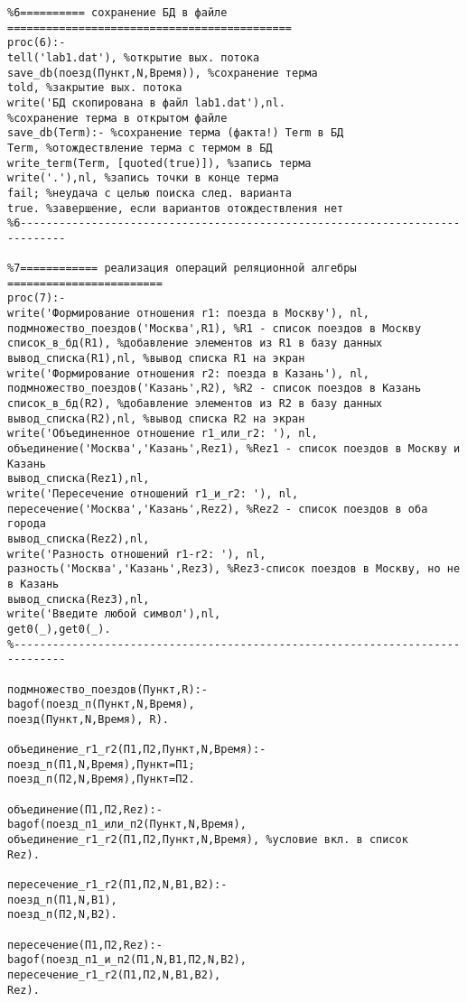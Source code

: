 \documentclass[a4paper,14pt]{extarticle}
\begin{document}
\begin{lstlisting}
%6========== сохранение БД в файле ============================================ 
proc(6):- 
tell('lab1.dat'), %открытие вых. потока 
save_db(поезд(Пункт,N,Время)), %сохранение терма 
told, %закрытие вых. потока 
write('БД скопирована в файл lab1.dat'),nl. 
%сохранение терма в открытом файле 
save_db(Term):- %сохранение терма (факта!) Term в БД 
Term, %отождествление терма с термом в БД 
write_term(Term, [quoted(true)]), %запись терма 
write('.'),nl, %запись точки в конце терма 
fail; %неудача с целью поиска след. варианта 
true. %завершение, если вариантов отождествления нет 
%6----------------------------------------------------------------------------- 
  
%7============ реализация операций реляционной алгебры ======================== 
proc(7):- 
write('Формирование отношения r1: поезда в Москву'), nl, 
подмножество_поездов('Москва',R1), %R1 - список поездов в Москву 
список_в_бд(R1), %добавление элементов из R1 в базу данных 
вывод_списка(R1),nl, %вывод списка R1 на экран 
write('Формирование отношения r2: поезда в Казань'), nl, 
подмножество_поездов('Казань',R2), %R2 - список поездов в Казань 
список_в_бд(R2), %добавление элементов из R2 в базу данных 
вывод_списка(R2),nl, %вывод списка R2 на экран 
write('Объединенное отношение r1_или_r2: '), nl, 
объединение('Москва','Казань',Rez1), %Rez1 - список поездов в Москву и Казань 
вывод_списка(Rez1),nl, 
write('Пересечение отношений r1_и_r2: '), nl, 
пересечение('Москва','Казань',Rez2), %Rez2 - список поездов в оба города 
вывод_списка(Rez2),nl, 
write('Разность отношений r1-r2: '), nl, 
разность('Москва','Казань',Rez3), %Rez3-список поездов в Москву, но не в Казань 
вывод_списка(Rez3),nl, 
write('Введите любой символ'),nl, 
get0(_),get0(_). 
%------------------------------------------------------------------------------ 
  
подмножество_поездов(Пункт,R):- 
bagof(поезд_п(Пункт,N,Время), 
поезд(Пункт,N,Время), R). 
  
объединение_r1_r2(П1,П2,Пункт,N,Время):- 
поезд_п(П1,N,Время),Пункт=П1; 
поезд_п(П2,N,Время),Пункт=П2. 
  
объединение(П1,П2,Rez):- 
bagof(поезд_п1_или_п2(Пункт,N,Время), 
объединение_r1_r2(П1,П2,Пункт,N,Время), %условие вкл. в список 
Rez). 
  
пересечение_r1_r2(П1,П2,N,В1,В2):- 
поезд_п(П1,N,В1), 
поезд_п(П2,N,В2). 
  
пересечение(П1,П2,Rez):- 
bagof(поезд_п1_и_п2(П1,N,В1,П2,N,В2), 
пересечение_r1_r2(П1,П2,N,В1,В2), 
Rez). 
  

\end{lstlisting}
\end{document}
